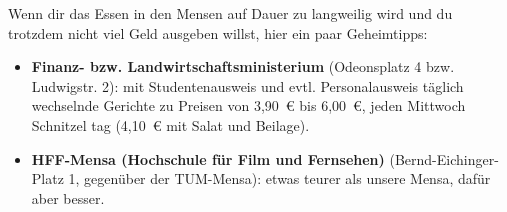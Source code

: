 Wenn dir das Essen in den Mensen auf Dauer zu langweilig wird und du trotzdem nicht viel Geld ausgeben willst, hier ein paar Geheimtipps:

\begin{itemize}
	\item \textbf{Finanz- bzw. Landwirtschaftsministerium} (Odeonsplatz 4 bzw. Ludwigstr. 2): mit Studentenausweis 		und evtl. Personalausweis täglich wechselnde Gerichte zu Preisen von 3,90~€ bis 6,00~€, jeden Mittwoch Schnitzel		tag (4,10~€ mit Salat und Beilage).
	
	\item \textbf{HFF-Mensa (Hochschule für Film und Fernsehen)}
          (Bernd-Eichinger-Platz 1, gegenüber der TUM-Mensa): etwas
          teurer als unsere Mensa, dafür aber besser.
\end{itemize}

\begin{urlList}
\end{urlList}
